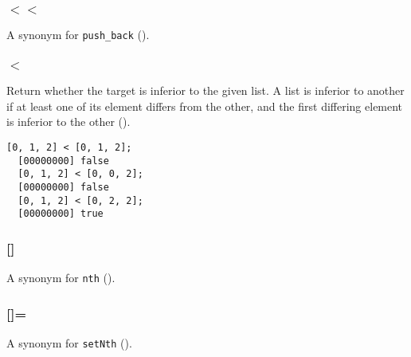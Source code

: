 \subsubsection{$<<$}

A synonym for \lstinline|push_back| ().

\subsubsection{$<$}

Return whether the target is inferior to the given list. A list is
inferior to another if at least one of its element differs from the
other, and the first differing element is inferior to the other
().

\begin{lstlisting}[caption=List.'', label=lst:list-inf,
  float=\floatpos]
  [0, 1, 2] < [0, 1, 2];
  [00000000] false
  [0, 1, 2] < [0, 0, 2];
  [00000000] false
  [0, 1, 2] < [0, 2, 2];
  [00000000] true
\end{lstlisting}

\subsubsection{[]}
A synonym for \lstinline|nth| ().

\subsubsection{[]=}
A synonym for \lstinline|setNth| ().

